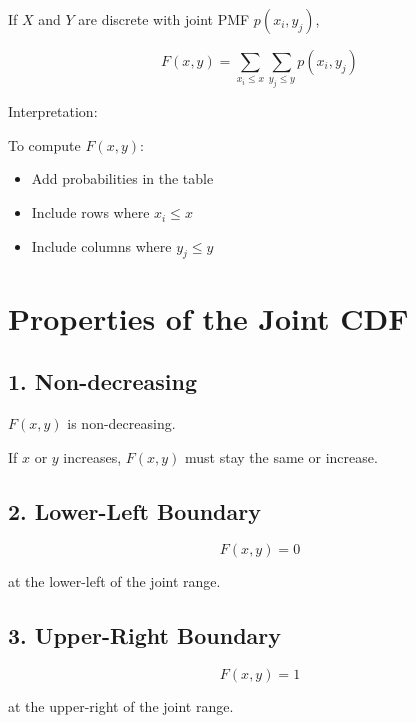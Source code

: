 \documentclass[11pt]{article}
\begin{document}
If $X$ and $Y$ are discrete with joint PMF $p(x_i,y_j)$,

\[
F(x,y) = \sum_{x_i \le x} \sum_{y_j \le y} p(x_i,y_j)
\]

Interpretation:

To compute $F(x,y)$:
\begin{itemize}[noitemsep]
\item Add probabilities in the table
\item Include rows where $x_i \le x$
\item Include columns where $y_j \le y$
\end{itemize}

\section{Properties of the Joint CDF}

\subsection*{1. Non-decreasing}

$F(x,y)$ is non-decreasing.

If $x$ or $y$ increases, $F(x,y)$ must stay the same or increase.

\subsection*{2. Lower-Left Boundary}

\[
F(x,y) = 0
\]

at the lower-left of the joint range.

\subsection*{3. Upper-Right Boundary}

\[
F(x,y) = 1
\]

at the upper-right of the joint range.
\end{document}
